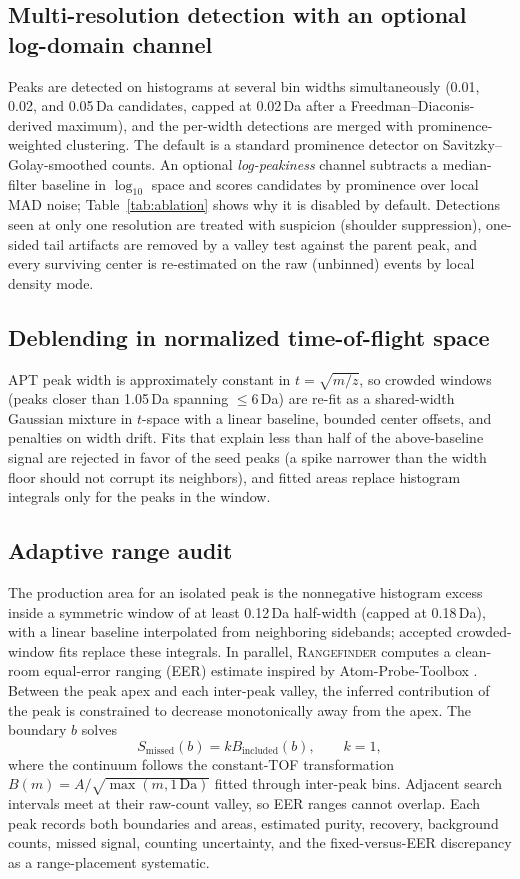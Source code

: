 \documentclass[11pt]{article}
\newcommand{\rf}{\textsc{Rangefinder}}
\begin{document}
\subsection{Multi-resolution detection with an optional log-domain channel}
Peaks are detected on histograms at several bin widths simultaneously
(0.01, 0.02, and 0.05\,Da candidates, capped at 0.02\,Da after a
Freedman--Diaconis-derived
maximum), and the per-width detections are merged with
prominence-weighted clustering. The default is a standard prominence
detector on Savitzky--Golay-smoothed counts. An optional
\emph{log-peakiness} channel subtracts a median-filter baseline in
$\log_{10}$ space and scores candidates by prominence over local MAD noise;
Table~\ref{tab:ablation} shows why it is disabled by default.
Detections seen at only one resolution are treated with suspicion
(shoulder suppression), one-sided tail artifacts are removed by a
valley test against the parent peak, and every surviving center is
re-estimated on the raw (unbinned) events by local density mode.

\subsection{Deblending in normalized time-of-flight space}
APT peak width is approximately constant in $t=\sqrt{m/z}$, so crowded
windows (peaks closer than 1.05\,Da spanning $\leq 6$\,Da) are re-fit as a
shared-width Gaussian mixture in $t$-space with a linear baseline, bounded
center offsets, and penalties on width drift. Fits that explain less than
half of the above-baseline signal are rejected in favor of the seed peaks
(a spike narrower than the width floor should not corrupt its neighbors),
and fitted areas replace histogram integrals only for the peaks in the
window.

\subsection{Adaptive range audit}
The production area for an isolated peak is the nonnegative histogram
excess inside a symmetric window of at least 0.12\,Da half-width (capped at
0.18\,Da), with a linear baseline interpolated from neighboring sidebands;
accepted crowded-window fits replace these integrals. In parallel, \rf{}
computes a clean-room equal-error ranging (EER) estimate inspired by
Atom-Probe-Toolbox \citep{felfer_toolbox}. Between the peak apex and each
inter-peak valley, the inferred contribution of the peak is constrained to
decrease monotonically away from the apex. The boundary $b$ solves
\begin{equation}
S_{\mathrm{missed}}(b)=k B_{\mathrm{included}}(b), \qquad k=1,
\end{equation}
where the continuum follows the constant-TOF transformation
$B(m)=A/\sqrt{\max(m,1\,\mathrm{Da})}$ fitted through inter-peak bins.
Adjacent search intervals meet at their raw-count valley, so EER ranges
cannot overlap. Each peak records both boundaries and areas, estimated
purity, recovery, background counts, missed signal, counting uncertainty,
and the fixed-versus-EER discrepancy as a range-placement systematic.
\end{document}
